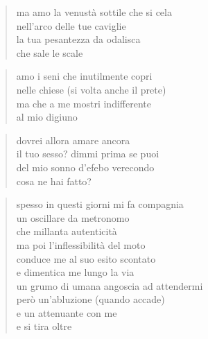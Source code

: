 \clearpage


\vspace*{2cm}

	\begin{verse}
		ma amo la venustà sottile che si cela\\
		nell'arco delle tue caviglie\\
		la tua pesantezza da odalisca\\
		che sale le scale
	\end{verse}

	\begin{verse}
		amo i seni che inutilmente copri\\
		nelle chiese (si volta anche il prete)\\
		ma che a me mostri indifferente\\
		al mio digiuno
	\end{verse}

	\begin{verse}
		dovrei allora amare ancora\\
		il tuo sesso? dimmi prima se puoi\\
		del mio sonno d'efebo verecondo\\
		cosa ne hai fatto?
	\end{verse}

\clearpage


\vspace*{2cm}

	\begin{verse}
		spesso in questi giorni mi fa compagnia\\
		un oscillare da metronomo\\
		che millanta autenticità\\
		ma poi l'inflessibilità del moto\\
		conduce me al suo esito scontato\\
		e dimentica me lungo la via\\
		un grumo di umana angoscia ad attendermi\\
		però un'abluzione (quando accade)\\
		e un attenuante con me\\
		e si tira oltre
	\end{verse}

\clearpage


\vspace*{2cm}

